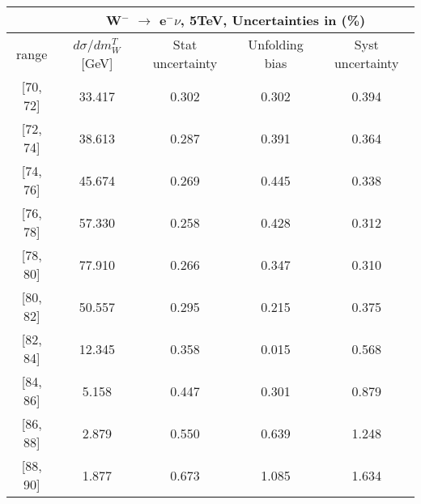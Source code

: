 \documentclass[12pt]{article}
\begin{document}
 
\begin{table}[] 
\begin{tabular}{c|c|c|c|c|}
\cline{2-5}
& \multicolumn{4}{c|}{W$^{-}$ $\rightarrow$ e$^{-} \nu $, 5TeV, Uncertainties in (\%)}  \\ \hline \hline 
\multicolumn{1}{|c|}{  range } & $d\sigma$/$dm^{T}_{W}$ [GeV]     & Stat uncertainty     & Unfolding bias     & Syst uncertainty        \\ \hline \hline 
\multicolumn{1}{|c|}{{[}70,  72{]}}  & 33.417 & 0.302 & 0.302 & 0.394 \\ \hline 
\multicolumn{1}{|c|}{{[}72,  74{]}}  & 38.613 & 0.287 & 0.391 & 0.364 \\ \hline 
\multicolumn{1}{|c|}{{[}74,  76{]}}  & 45.674 & 0.269 & 0.445 & 0.338 \\ \hline 
\multicolumn{1}{|c|}{{[}76,  78{]}}  & 57.330 & 0.258 & 0.428 & 0.312 \\ \hline 
\multicolumn{1}{|c|}{{[}78,  80{]}}  & 77.910 & 0.266 & 0.347 & 0.310 \\ \hline 
\multicolumn{1}{|c|}{{[}80,  82{]}}  & 50.557 & 0.295 & 0.215 & 0.375 \\ \hline 
\multicolumn{1}{|c|}{{[}82,  84{]}}  & 12.345 & 0.358 & 0.015 & 0.568 \\ \hline 
\multicolumn{1}{|c|}{{[}84,  86{]}}  & 5.158 & 0.447 & 0.301 & 0.879 \\ \hline 
\multicolumn{1}{|c|}{{[}86,  88{]}}  & 2.879 & 0.550 & 0.639 & 1.248 \\ \hline 
\multicolumn{1}{|c|}{{[}88,  90{]}}  & 1.877 & 0.673 & 1.085 & 1.634 \\ \hline 
\end{tabular}
\end{table}
\end{document}

